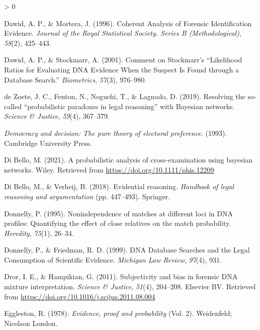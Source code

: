 \documentclass[
  10pt,
  dvipsnames,enabledeprecatedfontcommands]{scrartcl}
\newlength{\cslhangindent}
\newenvironment{CSLReferences}[2] %
 {%
  \setlength{\parindent}{0pt}
  \ifodd #1 \everypar{\setlength{\hangindent}{\cslhangindent}}\ignorespaces\fi
  \ifnum #2 > 0
  \setlength{\parskip}{#2\baselineskip}
  \fi
 }%
 {}
\begin{document}
\begin{CSLReferences}{1}{0}
\leavevmode\hypertarget{ref-dawid1996CoherentAnalysisForensic}{}%
Dawid, A. P., \& Mortera, J. (1996). Coherent {Analysis} of {Forensic
Identification Evidence}. \emph{Journal of the Royal Statistical
Society. Series B (Methodological)}, \emph{58}(2), 425--443.

\leavevmode\hypertarget{ref-dawid2001CommentStockmarrLikelihood}{}%
Dawid, A. P., \& Stockmarr, A. (2001). Comment on {Stockmarr}'s
{``{Likelihood Ratios} for {Evaluating DNA Evidence When} the {Suspect
Is Found} through a {Database Search}.''} \emph{Biometrics},
\emph{57}(3), 976--980.

\leavevmode\hypertarget{ref-dezoete2019ResolvingSocalledProbabilistic}{}%
de Zoete, J. C., Fenton, N., Noguchi, T., \& Lagnado, D. (2019).
Resolving the so-called {``probabilistic paradoxes in legal reasoning''}
with {Bayesian} networks. \emph{Science \& Justice}, \emph{59}(4),
367--379.

\leavevmode\hypertarget{ref-brennan_lomasky_1993}{}%
\emph{Democracy and decision: The pure theory of electoral preference}.
(1993). Cambridge University Press.

\leavevmode\hypertarget{ref-Bello2021probabilisticCrossexamination}{}%
Di Bello, M. (2021). A probabilistic analysis of cross-examination using
bayesian networks. Wiley. Retrieved from
\url{https://doi.org/10.1111/phis.12209}

\leavevmode\hypertarget{ref-di2018evidential}{}%
Di Bello, M., \& Verheij, B. (2018). Evidential reasoning.
\emph{Handbook of legal reasoning and argumentation} (pp. 447--493).
Springer.

\leavevmode\hypertarget{ref-donnelly1995NonindependenceMatchesDifferent}{}%
Donnelly, P. (1995). Nonindependence of matches at different loci in
{DNA} profiles: Quantifying the effect of close relatives on the match
probability. \emph{Heredity}, \emph{75}(1), 26--34.

\leavevmode\hypertarget{ref-donnelly1999DNADatabaseSearches}{}%
Donnelly, P., \& Friedman, R. D. (1999). {DNA Database Searches} and the
{Legal Consumption} of {Scientific Evidence}. \emph{Michigan Law
Review}, \emph{97}(4), 931.

\leavevmode\hypertarget{ref-Dror2011subjectivity}{}%
Dror, I. E., \& Hampikian, G. (2011). Subjectivity and bias in forensic
{DNA} mixture interpretation. \emph{Science {\&} Justice}, \emph{51}(4),
204--208. Elsevier {BV}. Retrieved from
\url{https://doi.org/10.1016/j.scijus.2011.08.004}

\leavevmode\hypertarget{ref-eggleston1978evidence}{}%
Eggleston, R. (1978). \emph{Evidence, proof and probability} (Vol. 2).
Weidenfeld; Nicolson London.


\end{CSLReferences}
\end{document}
